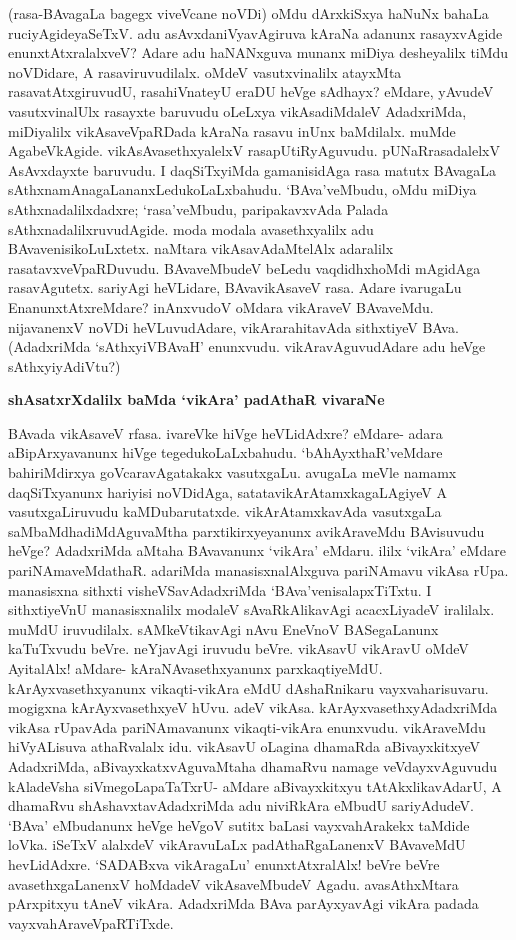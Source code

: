 (rasa-BAvagaLa bagegx viveVcane noVDi) oMdu dArxkiSxya haNuNx bahaLa ruciyAgideyaSeTxV. adu asAvxdaniVyavAgiruva kAraNa adanunx rasayxvAgide enunxtAtxralalxveV? Adare adu haNANxguva munanx miDiya desheyalilx tiMdu noVDidare, A rasaviruvudilalx. oMdeV vasutxvinalilx atayxMta rasavatAtxgiruvudU, rasahiVnateyU eraDU heVge sAdhayx? eMdare, yAvudeV vasutxvinalUlx rasayxte baruvudu oLeLxya vikAsadiMdaleV AdadxriMda, miDiyalilx vikAsaveVpaRDada kAraNa rasavu inUnx baMdilalx. muMde AgabeVkAgide. vikAsAvasethxyalelxV rasapUtiRyAguvudu. pUNaRrasadalelxV AsAvxdayxte baruvudu. I daqSiTxyiMda gamanisidAga rasa matutx BAvagaLa sAthxnamAnagaLananxLedukoLaLxbahudu. `BAva'veMbudu, oMdu miDiya sAthxnadalilxdadxre; `rasa'veMbudu, paripakavxvAda Palada sAthxnadalilxruvudAgide. moda modala avasethxyalilx adu BAvavenisikoLuLxtetx. naMtara vikAsavAdaMtelAlx adaralilx rasatavxveVpaRDuvudu. BAvaveMbudeV beLedu vaqdidhxhoMdi mAgidAga rasavAgutetx. sariyAgi heVLidare, BAvavikAsaveV rasa. Adare ivarugaLu EnanunxtAtxreMdare? inAnxvudoV oMdara vikAraveV BAvaveMdu. nijavanenxV noVDi heVLuvudAdare, vikArarahitavAda sithxtiyeV BAva. (AdadxriMda `sAthxyiVBAvaH' enunxvudu. vikAravAguvudAdare adu heVge sAthxyiyAdiVtu?)

{\bf shAsatxrXdalilx baMda `vikAra' padAthaR vivaraNe}

BAvada vikAsaveV rfasa. ivareVke hiVge heVLidAdxre? eMdare- adara aBipArxyavanunx hiVge tegedukoLaLxbahudu. `bAhAyxthaR'veMdare bahiriMdirxya goVcaravAgatakakx vasutxgaLu. avugaLa meVle namamx daqSiTxyanunx hariyisi noVDidAga, satatavikArAtamxkagaLAgiyeV A vasutxgaLiruvudu kaMDubarutatxde. vikArAtamxkavAda vasutxgaLa saMbaMdhadiMdAguvaMtha parxtikirxyeyanunx avikAraveMdu BAvisuvudu heVge? AdadxriMda aMtaha BAvavanunx `vikAra' eMdaru. ililx `vikAra' eMdare pariNAmaveMdathaR. adariMda manasisxnalAlxguva pariNAmavu vikAsa rUpa. manasisxna sithxti visheVSavAdadxriMda `BAva'venisalapxTiTxtu. I sithxtiyeVnU manasisxnalilx modaleV sAvaRkAlikavAgi acacxLiyadeV iralilalx. muMdU iruvudilalx. sAMkeVtikavAgi nAvu EneVnoV BASegaLanunx kaTuTxvudu beVre. neYjavAgi iruvudu beVre. vikAsavU vikAravU oMdeV AyitalAlx! aMdare- kAraNAvasethxyanunx parxkaqtiyeMdU. kArAyxvasethxyanunx vikaqti-vikAra eMdU dAshaRnikaru vayxvaharisuvaru. mogigxna kArAyxvasethxyeV hUvu. adeV vikAsa. kArAyxvasethxyAdadxriMda vikAsa rUpavAda pariNAmavanunx vikaqti-vikAra enunxvudu. vikAraveMdu hiVyALisuva athaRvalalx idu. vikAsavU oLagina dhamaRda aBivayxkitxyeV AdadxriMda, aBivayxkatxvAguvaMtaha dhamaRvu namage veVdayxvAguvudu kAladeVsha siVmegoLapaTaTxrU- aMdare aBivayxkitxyu tAtAkxlikavAdarU, A dhamaRvu shAshavxtavAdadxriMda adu niviRkAra eMbudU sariyAdudeV. `BAva' eMbudanunx heVge heVgoV sutitx baLasi vayxvahArakekx taMdide loVka. iSeTxV alalxdeV vikAravuLaLx padAthaRgaLanenxV BAvaveMdU hevLidAdxre. `SADABxva vikAragaLu' enunxtAtxralAlx! beVre beVre avasethxgaLanenxV hoMdadeV vikAsaveMbudeV Agadu. avasAthxMtara pArxpitxyu tAneV vikAra. AdadxriMda BAva parAyxyavAgi vikAra padada vayxvahAraveVpaRTiTxde.

